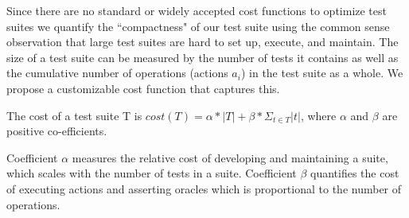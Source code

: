 Since there are no standard or widely accepted cost functions to optimize test suites we quantify the ``compactness"  of our test suite using the common sense observation that large test suites are hard to set up, execute, and maintain. The size of a test suite can be measured by the number of tests it contains as well as the cumulative number of operations (actions $a_i$) in the test suite as a whole.
We propose a customizable cost function that captures this.


\begin{mydef}
\label{def:costfunction}
The cost of a test suite T is $cost(T) = \alpha * |T| + \beta * \Sigma_{t \in T} |t|$, where $\alpha$ and $\beta$ are positive co-efficients. \end{mydef}

Coefficient $\alpha$ measures the relative cost of developing and maintaining a suite, which scales with the number of tests in a suite. Coefficient $\beta$ quantifies the cost of executing actions and asserting oracles which is proportional to the number of operations.
